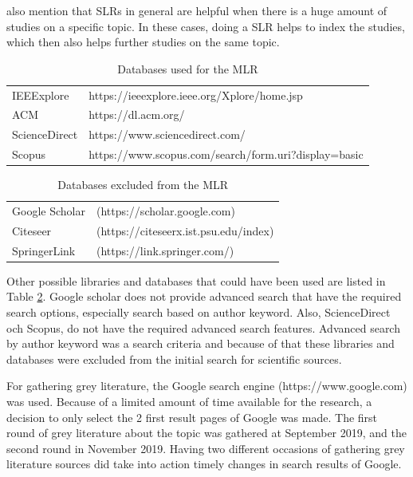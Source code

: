 \documentclass[english, 12pt, a4paper, sci, utf8, a-1b, online]{aaltothesis}
\begin{document}
\textcite{guidelines-for-MLR} also mention that SLRs in general are helpful when there is a huge amount of studies on a specific topic. In these cases, doing a SLR helps to index the studies, which then also helps further studies on the same topic.

\begin{table}[h]
  \centering
  \begin{tabular}{ l l }
    \hline
    IEEExplore    & https://ieeexplore.ieee.org/Xplore/home.jsp          \\
    ACM           & https://dl.acm.org/                                  \\
    ScienceDirect & https://www.sciencedirect.com/                       \\
    Scopus        & https://www.scopus.com/search/form.uri?display=basic \\
    \hline
  \end{tabular}
  \caption{Databases used for the MLR}
  \label{table:included-databases}
\end{table}

\begin{table}[h]
  \centering
  \begin{tabular}{ l l }
    \hline
    Google Scholar & (https://scholar.google.com)          \\
    Citeseer       & (https://citeseerx.ist.psu.edu/index) \\
    SpringerLink   & (https://link.springer.com/)          \\
    \hline
  \end{tabular}
  \caption{Databases excluded from the MLR}
  \label{table:excluded-databases}
\end{table}

Other possible libraries and databases that could have been used are listed in Table \ref{table:excluded-databases}. Google scholar does not provide advanced search that have the required search options, especially search based on author keyword. Also, ScienceDirect och Scopus, do not have the required advanced search features. Advanced search by author keyword was a search criteria and because of that these libraries and databases were excluded from the initial search for scientific sources.

For gathering grey literature, the Google search engine (https://www.google.com) was used. Because of a limited amount of time available for the research, a decision to only select the 2 first result pages of Google was made. The first round of grey literature about the topic was gathered at September 2019, and the second round in November 2019. Having two different occasions of gathering grey literature sources did take into action timely changes in search results of Google.
\end{document}
